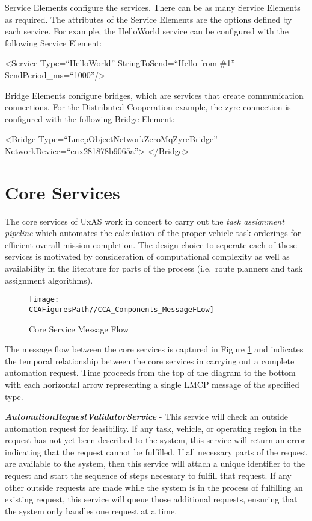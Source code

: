 Service Elements configure the services. There can be as many Service
Elements as required. The attributes of the Service Elements are the
options defined by each service. For example, the HelloWorld service can
be configured with the following Service Element:

\textless{}Service Type=``HelloWorld'' StringToSend=``Hello from \#1''
SendPeriod\_ms=``1000''/\textgreater{}

Bridge Elements configure bridges, which are services that create
communication connections. For the Distributed Cooperation example, the
zyre connection is configured with the following Bridge Element:

\textless{}Bridge Type=``LmcpObjectNetworkZeroMqZyreBridge''
NetworkDevice=``enx281878b9065a''\textgreater{}
\textless{}/Bridge\textgreater{}

\section{Core Services}\label{core-services}

The core services of UxAS work in concert to carry out the \emph{task
assignment pipeline} which automates the calculation of the proper
vehicle-task orderings for efficient overall mission completion. The
design choice to seperate each of these services is motivated by
consideration of computational complexity as well as availability in the
literature for parts of the process (i.e.~route planners and task
assignment algorithms).

\begin{figure}
\centering
\texttt{[image: \\CCAFiguresPath//CCA\_Components\_MessageFLow]}
\caption{Core Service Message Flow}
\label{fig:CoreServiceMessageFlow}
\end{figure}

The message flow between the core services is captured in
Figure \ref{fig:CoreServiceMessageFlow} and indicates the temporal
relationship between the core services in carrying out a complete
automation request. Time proceeds from the top of the diagram to the
bottom with each horizontal arrow representing a single LMCP message of
the specified type.

\textbf{\emph{AutomationRequestValidatorService}} - This service will
check an outside automation request for feasibility. If any task,
vehicle, or operating region in the request has not yet been described
to the system, this service will return an error indicating that the
request cannot be fulfilled. If all necessary parts of the request are
available to the system, then this service will attach a unique
identifier to the request and start the sequence of steps necessary to
fulfill that request. If any other outside requests are made while the
system is in the process of fulfilling an existing request, this service
will queue those additional requests, ensuring that the system only
handles one request at a time.

